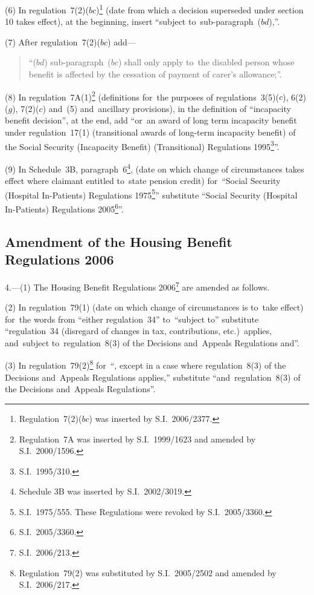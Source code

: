 \documentclass[12pt,a4paper]{article}
\begin{document}
(6) In regulation~7(2)($bc$)\footnote{Regulation~7(2)($bc$)  was inserted by S.I.~2006/2377.} (date from which a decision superseded under section 10 takes effect), at the beginning, insert “subject to~sub-\hspace{0pt}paragraph~($bd$),”.

(7) After regulation~7(2)($bc$)  add—
\begin{quotation}
“($bd$) sub-paragraph~($bc$)  shall only apply to~the disabled person whose benefit is affected by the cessation of payment of carer’s allowance;”.
\end{quotation}

(8) In regulation~7A(1)\footnote{Regulation~7A was inserted by S.I.~1999/1623 and amended by S.I.~2000/1596.} (definitions for~the purposes of regulations~3(5)($c$), 6(2)($g$), 7(2)($c$)  and~(5) and~ancillary provisions), in the definition of “incapacity benefit decision”, at the end, add “or~an award of long term incapacity benefit under regulation~17(1) (transitional awards of long-term incapacity benefit) of the Social Security (Incapacity Benefit) (Transitional) Regulations 1995\footnote{S.I.~1995/310.}”.

(9) In Schedule~3B, paragraph~6\footnote{Schedule 3B was inserted by S.I.~2002/3019.}, (date on which change of circumstances takes effect where claimant entitled to~state pension credit) for~“Social Security (Hospital In-Patients) Regulations 1975\footnote{S.I.~1975/555. These Regulations were revoked by S.I.~2005/3360.}” substitute “Social Security (Hospital In-Patients) Regulations 2005\footnote{S.I.~2005/3360.}”.

\subsection[4. Amendment of the Housing Benefit Regulations 2006]{Amendment of the Housing Benefit Regulations 2006}

4.---(1)  The Housing Benefit Regulations 2006\footnote{S.I.~2006/213.} are amended as follows.

(2) In regulation~79(1) (date on which change of circumstances is to~take effect) for~the words from “either regulation~34” to~“subject to” substitute “regulation~34 (disregard of changes in tax, contributions, etc.)\ applies, and~subject to~regulation~8(3) of the Decisions and~Appeals Regulations and”.

(3) In regulation~79(2)\footnote{Regulation~79(2) was substituted by S.I.~2005/2502 and amended by S.I.~2006/217.} for~“, except in a case where regulation~8(3) of the Decisions and~Appeals Regulations applies,” substitute “and~regulation~8(3) of the Decisions and~Appeals Regulations”.
\end{document}
